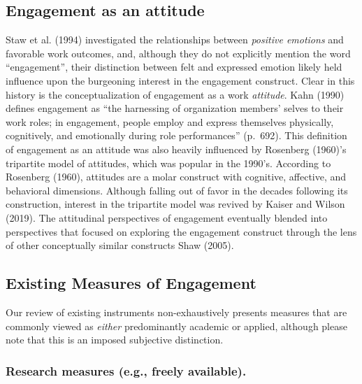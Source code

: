 \documentclass[
  man]{apa6}
\begin{document}
\hypertarget{engagement-as-an-attitude}{%
\subsection{Engagement as an attitude}\label{engagement-as-an-attitude}}

Staw et al. (1994) investigated the relationships between \emph{positive emotions} and favorable work outcomes, and, although they do not explicitly mention the word ``engagement'', their distinction between felt and expressed emotion likely held influence upon the burgeoning interest in the engagement construct. Clear in this history is the conceptualization of engagement as a work \emph{attitude}. Kahn (1990) defines engagement as ``the harnessing of organization members' selves to their work roles; in engagement, people employ and express themselves physically, cognitively, and emotionally during role performances'' (p.~692). This definition of engagement as an attitude was also heavily influenced by Rosenberg (1960)'s tripartite model of attitudes, which was popular in the 1990's. According to Rosenberg (1960), attitudes are a molar construct with cognitive, affective, and behavioral dimensions. Although falling out of favor in the decades following its construction, interest in the tripartite model was revived by Kaiser and Wilson (2019). The attitudinal perspectives of engagement eventually blended into perspectives that focused on exploring the engagement construct through the lens of other conceptually similar constructs Shaw (2005).

\hypertarget{existing-measures-of-engagement}{%
\subsection{Existing Measures of Engagement}\label{existing-measures-of-engagement}}

Our review of existing instruments non-exhaustively presents measures that are commonly viewed as \emph{either} predominantly academic or applied, although please note that this is an imposed subjective distinction.

\hypertarget{research-measures-e.g.-freely-available.}{%
\subsubsection{Research measures (e.g., freely available).}\label{research-measures-e.g.-freely-available.}}
\end{document}
